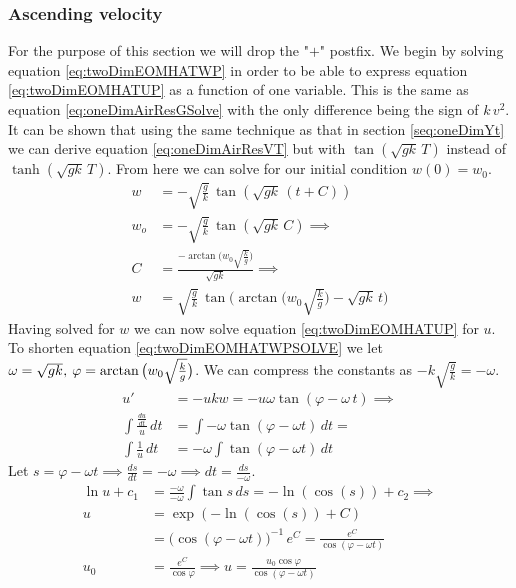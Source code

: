 \documentclass[%
aip,
jmp,
amsmath,amssymb,
reprint,%
]{revtex4-1}
\newcommand{\comma}{\hspace{0.1mm},\hspace{0.7mm}}
\begin{document}
	\subsubsection{Ascending velocity}
	For the purpose of this section we will drop the "$+$" postfix. We begin by solving equation \eqref{eq:twoDimEOMHATWP} in order to be able to express equation \eqref{eq:twoDimEOMHATUP} as a function of one variable. This is the same as equation \eqref{eq:oneDimAirResGSolve} with the only difference being the sign of $k\,v^2$. It can be shown that using the same technique as that in section \ref{seq:oneDimYt} we can derive equation \eqref{eq:oneDimAirResVT} but with $\tan(\sqrt{gk}\,T)$ instead of $\tanh(\sqrt{gk}\,T)$. From here we can solve for our initial condition $w(0) = w_0$.
	\begin{align}\nonumber
		w &= -\sqrt{\frac{g}{k}}\,\tan(\sqrt{gk}\,(t + C))\\\nonumber
		w_o &= -\sqrt{\frac{g}{k}}\,\tan(\sqrt{gk}\,C) \implies\\\nonumber
		C &= \frac{-\arctan\big(w_0\sqrt{\frac{k}{g}}\big)}{\sqrt{gk}} \implies\\\label{eq:twoDimEOMHATWPSOLVE}
		w &= \sqrt{\frac{g}{k}}\,\tan\big(\arctan\big(w_0\sqrt{\frac{k}{g}}\big) - \sqrt{gk}\,t\big)
	\end{align}
	Having solved for $w$ we can now solve equation \eqref{eq:twoDimEOMHATUP} for $u$. To shorten equation \eqref{eq:twoDimEOMHATWPSOLVE} we let $\omega = \sqrt{gk} \comma \varphi = \arctan\big(w_0\sqrt{\frac{k}{g}}\big)$. We can compress the constants as $-k\sqrt{\frac{g}{k}} = -\omega$.
	\begin{align}\nonumber 
		u' &= -ukw = -u\omega\tan(\varphi-\omega\,t) \implies\\\nonumber
		\int\frac{\frac{du}{dt}}{u}\,dt &= \int-\omega\tan(\varphi-\omega t)\,dt = \\\nonumber
		\int\frac{1}{u}\,dt &= -\omega\int\tan(\varphi-\omega t)\, dt
	\end{align}
	Let $s = \varphi-\omega t \implies \frac{ds}{dt} = -\omega \implies dt =  \frac{ds}{-\omega}$.
	\begin{align}\nonumber
		\ln u + c_1 &= \frac{-\omega}{-\omega}\int\tan s\,ds = -\ln(\cos(s)) +c_2 \implies\\\nonumber
		u &= \exp(-\ln(\cos(s)) + C)\\\nonumber
		&= \big(\cos(\varphi - \omega t)\big)^{-1}\,e^C = \frac{e^C}{\cos(\varphi - \omega t)}\\\label{eq:twoDimEOMHATUPSOLVE}
		u_0 &= \frac{e^C}{\cos\varphi} \implies u = \frac{u_0\cos\varphi}{\cos(\varphi - \omega t)}
	\end{align}
\end{document}

